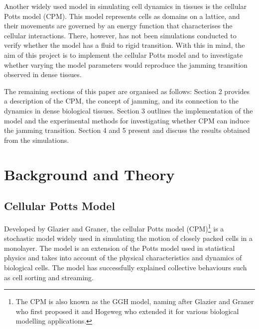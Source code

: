 \documentclass[a4paper,12pt]{article}
\begin{document}
Another widely used model in simulating cell dynamics in tissues is the cellular Potts model (CPM). This model represents cells as domains on a lattice, and their movements are governed by an energy function that characterises the cellular interactions. There, however, has not been simulations conducted to verify whether the model has a fluid to rigid transition. With this in mind, the aim of this project is to implement the cellular Potts model and to investigate whether varying the model parameters would reproduce the jamming transition observed in dense tissues. 

The remaining sections of this paper are organised as follows: Section 2 provides a description of the CPM, the concept of jamming, and its connection to the dynamics in dense biological tissues. Section 3 outlines the implementation of the model and the experimental methods for investigating whether CPM can induce the jamming transition. Section 4 and 5 present and discuss the results obtained from the simulations. 


%


\section{Background and Theory}
\subsection{Cellular Potts Model}
\label{sec:CPM}
Developed by Glazier and Graner\cite{graner1992}, the cellular Potts model (CPM)\footnote{The CPM is also known as the GGH model, naming after Glazier and Graner who first proposed it and Hogeweg who extended it for various biological modelling applications.} is a stochastic model widely used in simulating the motion of closely packed cells in a monolayer. The model is an extension of the Potts model used in statistical physics and takes into account of the physical characteristics and dynamics of biological cells. The model has successfully explained collective behaviours such as cell sorting \cite{graner1992} and streaming\cite{szabo2010}.
\end{document}

